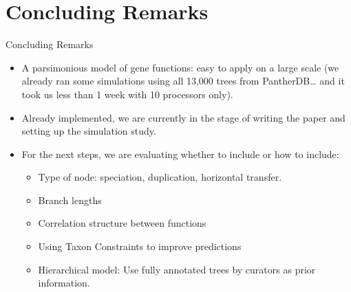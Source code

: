 \documentclass[9pt,ignorenonframetext,]{beamer}
\begin{document}
\section{Concluding Remarks}\label{concluding-remarks}

\begin{frame}{Concluding Remarks}

\begin{itemize}
\item
  A parsimonious model of gene functions: easy to apply on a large scale
  (we already ran some simulations using all 13,000 trees from
  PantherDB\ldots{} and it took us less than 1 week with 10 processors
  only).\pause 
\item
  Already implemented, we are currently in the stage of writing the
  paper and setting up the simulation study.\pause
\item
  For the next steps, we are evaluating whether to include or how to
  include:\pause

  \begin{itemize}
  \item
    Type of node: speciation, duplication, horizontal transfer.
  \item
    Branch lengths
  \item
    Correlation structure between functions
  \item
    Using Taxon Constraints to improve predictions
  \item
    Hierarchical model: Use fully annotated trees by curators as prior
    information.
  \end{itemize}
\end{itemize}

\end{frame}

\begin{frame}{}

\begin{center}
\huge
{}
\end{center}

\maketitle

\appendix

\end{frame}
\end{document}
